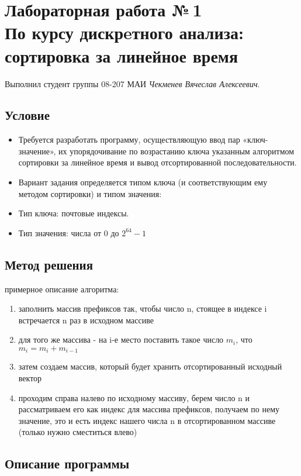 \documentclass[12pt]{article}
\begin{document}
\section*{Лабораторная работа №\,1\\По курсу дискрeтного анализа: сортировка за линейное время}

Выполнил студент группы 08-207 МАИ \textit{Чекменев Вячеслав Алексеевич}.

\subsection*{Условие}
\begin{itemize}
    \item Требуется разработать программу, осуществляющую ввод пар «ключ-значение», их упорядочивание по возрастанию ключа указанным алгоритмом сортировки за линейное время и вывод отсортированной последовательности.
    \item Вариант задания определяется типом ключа (и соответствующим ему методом сортировки) и типом значения:
    \item Тип ключа: почтовые индексы.
    
    \item Тип значения: числа от 0 до $2^{64} - 1$
    
\end{itemize}

\subsection*{Метод решения}

примерное описание алгоритма:
\begin{enumerate}
    \item заполнить массив префиксов так, чтобы число n, стоящее в индексе i встречается n раз в исходном массиве
    \item для того же массива - на i-е место поставить такое число $m_i$, что $m_i = m_i + m_{i-1}$
    \item затем создаем массив, который будет хранить отсортированный исходный вектор
    \item проходим справа налево по исходному массиву, берем число n и рассматриваем его как индекс для массива префиксов, получаем по нему значение, это и есть индекс нашего числа n в отсортированном массиве (только нужно сместиться влево)
\end{enumerate}

\subsection*{Описание программы}
\end{document}
